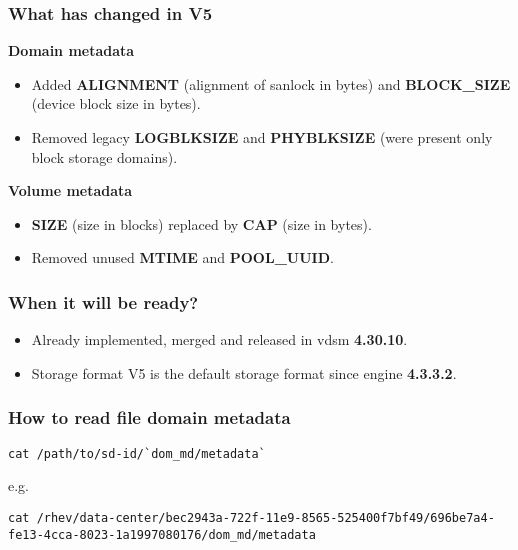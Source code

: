 \documentclass[10pt,utf8]{beamer}
\begin{document}
\begin{frame}
	\frametitle{What has changed in V5}
	\centering
	\Large{\textbf{Domain metadata}}
	\normalsize
	\vspace{0.5cm}
	\begin{itemize}
		\item Added \textbf{ALIGNMENT} (alignment of sanlock in bytes) and \textbf{BLOCK\_SIZE} (device block size in bytes).
		\item Removed legacy \textbf{LOGBLKSIZE} and \textbf{PHYBLKSIZE} (were present only block storage domains).
	\end{itemize}
	
	\vspace{1cm}
	
	\centering
	\Large{\textbf{Volume metadata}}
	\normalsize
	\vspace{0.5cm}
	\begin{itemize}
		\item \textbf{SIZE} (size in blocks) replaced by \textbf{CAP} (size in bytes).
		\item Removed unused \textbf{MTIME} and \textbf{POOL\_UUID}.
	\end{itemize}

\end{frame}

\begin{frame}
	\frametitle{When it will be ready?}
	\begin{itemize}
		\item Already implemented, merged and released in vdsm \textbf{4.30.10}.
		\item Storage format V5 is the default storage format since engine \textbf{4.3.3.2}.
	\end{itemize}
\end{frame}

\begin{frame}[fragile]
	\frametitle{How to read file domain metadata}
	\begin{lstlisting}[style=Bash]
cat /path/to/sd-id/`dom_md/metadata`
	\end{lstlisting}

	\vspace{0.5cm}
	e.g.
	\vspace{0.5cm}

	\begin{lstlisting}[style=Bash]
cat /rhev/data-center/bec2943a-722f-11e9-8565-525400f7bf49/696be7a4-fe13-4cca-8023-1a1997080176/dom_md/metadata
	\end{lstlisting}
\end{frame}
\end{document}
